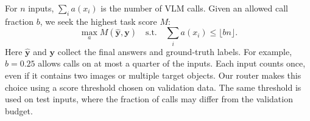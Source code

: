 For $n$ inputs, $\sum_i a(x_i)$ is the number of VLM calls. Given an allowed call fraction $b$, we seek the highest task score $M$:
\begin{equation}
\max_a M(\widehat{\mathbf y},\mathbf y)
\quad\text{s.t.}\quad \sum_i a(x_i)\leq\lfloor bn\rfloor.
\label{eq:budget}
\end{equation}
Here $\widehat{\mathbf y}$ and $\mathbf y$ collect the final answers and ground-truth labels. For example, $b=0.25$ allows calls on at most a quarter of the inputs. Each input counts once, even if it contains two images or multiple target objects. Our router makes this choice using a score threshold chosen on validation data. The same threshold is used on test inputs, where the fraction of calls may differ from the validation budget.
